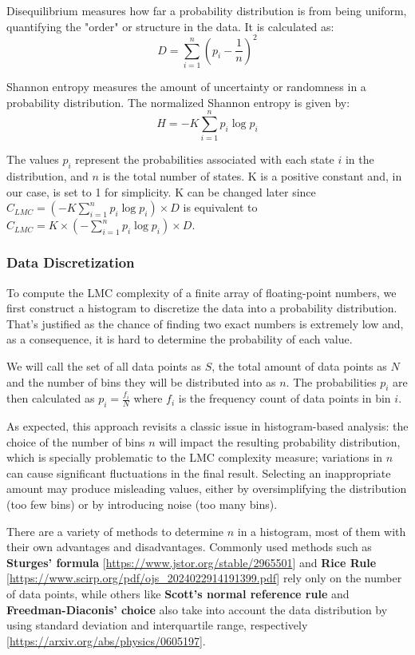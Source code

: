     Disequilibrium measures how far a probability distribution is from being uniform, quantifying the "order" or structure in the data. It is calculated as:
    \[ D = \sum_{i=1}^{n} \left(p_i - \frac{1}{n}\right)^2 \]

    Shannon entropy measures the amount of uncertainty or randomness in a probability distribution. The normalized Shannon entropy is given by:
    \[ H = -K \sum_{i=1}^{n} p_i \log p_i \]

    The values \( p_i \) represent the probabilities associated with each state \( i \) in the distribution, and \( n \) is the total number of states. K is a positive constant and, in our case, is set to 1 for simplicity. K can be changed later since \( C_{LMC} = (-K \sum_{i=1}^{n} p_i \log p_i)  \times D \) is equivalent to \( C_{LMC} = K \times (- \sum_{i=1}^{n} p_i \log p_i)  \times D \).

    \subsubsection{Data Discretization}

        To compute the LMC complexity of a finite array of floating-point numbers, we first construct a histogram to discretize the data into a probability distribution. That's justified as the chance of finding two exact numbers is extremely low and, as a consequence, it is hard to determine the probability of each value. 
        
        We will call the set of all data points as \( S \), the total amount of data points as \( N \) and the number of bins they will be distributed into as \( n \). The probabilities \( p_i \) are then calculated as \( p_i = \frac{f_i}{N} \) where \( f_i \) is the frequency count of data points in bin \( i \).

        As expected, this approach revisits a classic issue in histogram-based analysis: the choice of the number of bins \( n \) will impact the resulting probability distribution, which is specially problematic to the LMC complexity measure; variations in \( n \) can cause significant fluctuations in the final result. Selecting an inappropriate amount may produce misleading values, either by oversimplifying the distribution (too few bins) or by introducing noise (too many bins). 

        There are a variety of methods to determine \( n \) in a histogram, most of them with their own advantages and disadvantages. Commonly used methods such as \textbf{Sturges' formula} [\url{https://www.jstor.org/stable/2965501}] and \textbf{Rice Rule} [\url{https://www.scirp.org/pdf/ojs_2024022914191399.pdf}] rely only on the number of data points, while others like \textbf{Scott's normal reference rule} and \textbf{Freedman-Diaconis' choice} also take into account the data distribution by using standard deviation and interquartile range, respectively [\url{https://arxiv.org/abs/physics/0605197}].   

